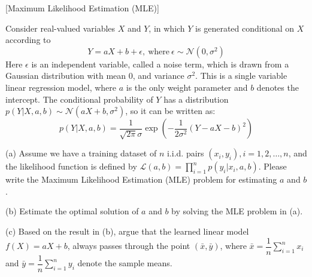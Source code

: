 \item {} [Maximum Likelihood Estimation (MLE)]

Consider real-valued variables $X$ and $Y$, in which $Y$ is generated conditional on $X$ according to
$$Y = aX + b + \epsilon, \ \text{where} \ \epsilon \sim \mathcal{N}(0, \sigma^2)$$
Here $\epsilon$ is an independent variable, called a noise term, which is drawn from a Gaussian distribution with mean 0, and variance $\sigma^2$. This is a single variable linear regression model, where $a$ is the only weight parameter and $b$ denotes the intercept. The conditional probability of $Y$ has a distribution $p(Y | X, a, b) \sim \mathcal{N}(aX+b, \sigma^2)$, so it can be written as:
$$p(Y|X, a,b) = \frac{1}{\sqrt{2\pi}\sigma}\exp\left(-\frac{1}{2\sigma^2}(Y - aX -b)^2\right)$$

(a) Assume we have a training dataset of $n$ i.i.d. pairs $(x_i, y_i), i = 1, 2, \ldots, n$, and the likelihood function is defined by $\mathcal{L}(a,b) = \prod\limits_{i=1}^n p(y_i | x_i, a, b)$. Please write the Maximum Likelihood Estimation (MLE) problem for estimating $a$ and $b$. ~

(b) Estimate the optimal solution of $a$ and $b$ by solving the MLE problem in (a).~

(c) Based on the result in (b), argue that the learned linear model $f(X) = aX + b$, always passes through the point $(\bar{x},\bar{y})$, where $\bar{x} = \dfrac{1}{n}\sum\limits_{i=1}^{n}x_{i}$ and $\bar{y} = \dfrac{1}{n}\sum\limits_{i=1}^{n}y_{i}$ denote the sample means.~

\solution









\newpage